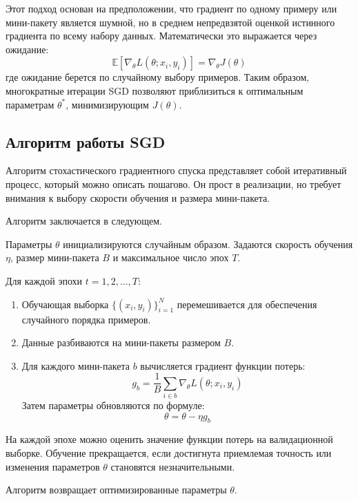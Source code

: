 \documentclass[11pt,a4paper]{article}
\begin{document}
Этот подход основан на предположении, что градиент по одному примеру или мини-пакету является шумной, но в среднем непредвзятой оценкой истинного градиента по всему набору данных. Математически это выражается через ожидание:
\begin{equation}
\mathbb{E}[\nabla_\theta L(\theta; x_i, y_i)] = \nabla_\theta J(\theta)
\end{equation}
где ожидание берется по случайному выбору примеров. Таким образом, многократные итерации SGD позволяют приблизиться к оптимальным параметрам \( \theta^* \), минимизирующим \( J(\theta) \).

\subsection{Алгоритм работы SGD}

Алгоритм стохастического градиентного спуска представляет собой итеративный процесс, который можно описать пошагово. Он прост в реализации, но требует внимания к выбору скорости обучения и размера мини-пакета. 

Алгоритм заключается в следующем.

Параметры $\theta$ инициализируются случайным образом. Задаются скорость обучения $\eta$, размер мини-пакета $B$ и максимальное число эпох $T$.

Для каждой эпохи $t = 1, 2, \dots, T$: 
\begin{enumerate}
    \item Обучающая выборка $\{(x_i, y_i)\}_{i=1}^N$ перемешивается для обеспечения случайного порядка примеров.
    \item Данные разбиваются на мини-пакеты размером $B$.
    \item Для каждого мини-пакета $b$ вычисляется градиент функции потерь:
    \begin{equation}
    g_b = \frac{1}{B} \sum_{i \in b} \nabla_\theta L(\theta; x_i, y_i)
    \end{equation}
    Затем параметры обновляются по формуле:
   \begin{equation}
    \theta = \theta - \eta g_b
    \end{equation}
\end{enumerate}

На каждой эпохе можно оценить значение функции потерь на валидационной выборке. Обучение прекращается, если достигнута приемлемая точность или изменения параметров $\theta$ становятся незначительными.

Алгоритм возвращает оптимизированные параметры $\theta$.
\end{document}

